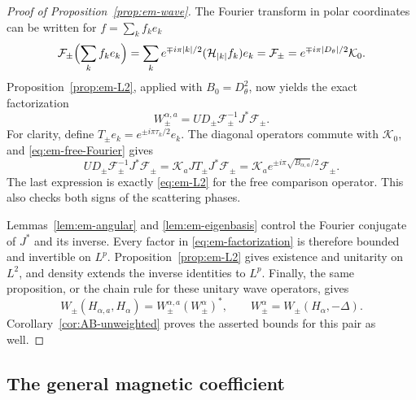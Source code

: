 \documentclass[11pt,a4paper,reqno,backref=page]{amsart}
\newcommand{\HH}{\mathcal H}                 %
\numberwithin{equation}{section}
\theoremstyle{definition}
\theoremstyle{remark}
\begin{document}
\begin{proof}[Proof of Proposition~\ref{prop:em-wave}]
  The Fourier transform in polar coordinates can be written
  for $f=\sum_k f_ke_k$
  \begin{equation}\label{eq:em-free-Fourier}
    \mathcal F_\pm\Bigl(\sum_k f_ke_k\Bigr)
        =\sum_k e^{\mp i\pi|k|/2}
          (\HH_{|k|}f_k)e_k =
      \mathcal F_\pm
        =e^{\mp i\pi|D_\theta|/2}\mathcal K_0.
  \end{equation}
  Proposition~\ref{prop:em-L2}, applied with $B_0=D_\theta^2$,
  now yields the exact factorization
  \begin{equation}\label{eq:em-factorization}
    W_\pm^{\alpha,a}
    =U D_\pm\mathcal F_\pm^{-1}J^*\mathcal F_\pm.
  \end{equation}
  For clarity, define $T_\pm e_k=e^{\pm i\pi\tau_k/2}e_k$.
  The diagonal operators commute with $\mathcal K_0$, and
  \eqref{eq:em-free-Fourier} gives
  \begin{equation*}
    U D_\pm\mathcal F_\pm^{-1}J^*\mathcal F_\pm
      =\mathcal K_aJ T_\pm J^*\mathcal F_\pm =
      \mathcal K_a e^{\pm i\pi\sqrt{B_{\alpha,a}}/2}
        \mathcal F_\pm.
  \end{equation*}
  The last expression is exactly \eqref{eq:em-L2} for the
  free comparison operator. This also checks both signs of
  the scattering phases.

  Lemmas~\ref{lem:em-angular} and \ref{lem:em-eigenbasis}
  control the Fourier conjugate of $J^*$ and its inverse.
  Every factor in \eqref{eq:em-factorization} is therefore
  bounded and invertible on $L^p$. Proposition~\ref{prop:em-L2}
  gives existence and unitarity on $L^2$, and density extends
  the inverse identities to $L^p$. Finally, the same
  proposition, or the chain rule for these unitary wave
  operators, gives
  \begin{equation*}
    W_\pm(H_{\alpha,a},H_\alpha)
    =W_\pm^{\alpha,a}(W_\pm^\alpha)^*,
    \qquad W_\pm^\alpha=W_\pm(H_\alpha,-\Delta).
  \end{equation*}
  Corollary~\ref{cor:AB-unweighted} proves the asserted
  bounds for this pair as well.
\end{proof}

\subsection{The general magnetic coefficient}
\end{document}
